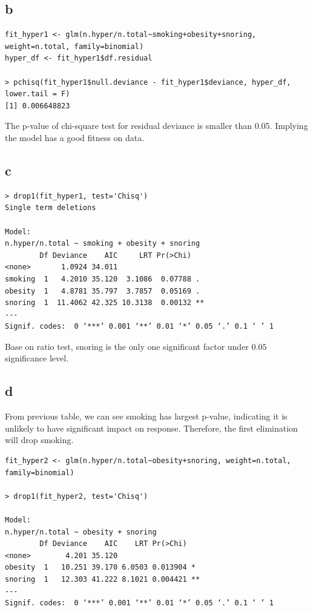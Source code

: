 \documentclass[11pt,letterpaper]{article}
\begin{document}
\subsection*{b}
\begin{verbatim}
fit_hyper1 <- glm(n.hyper/n.total~smoking+obesity+snoring, weight=n.total, family=binomial)
hyper_df <- fit_hyper1$df.residual

> pchisq(fit_hyper1$null.deviance - fit_hyper1$deviance, hyper_df, lower.tail = F)
[1] 0.006648823
\end{verbatim}

\noindent The p-value of chi-square test for residual deviance is smaller than 0.05. Implying the model has a good fitness on data. 

\subsection*{c}
\begin{verbatim}
> drop1(fit_hyper1, test='Chisq')
Single term deletions

Model:
n.hyper/n.total ~ smoking + obesity + snoring
        Df Deviance    AIC     LRT Pr(>Chi)   
<none>       1.0924 34.011                    
smoking  1   4.2010 35.120  3.1086  0.07788 . 
obesity  1   4.8781 35.797  3.7857  0.05169 . 
snoring  1  11.4062 42.325 10.3138  0.00132 **
---
Signif. codes:  0 ‘***’ 0.001 ‘**’ 0.01 ‘*’ 0.05 ‘.’ 0.1 ‘ ’ 1
\end{verbatim}

\noindent Base on ratio test, snoring is the only one significant factor under $0.05$ significance level. 

\subsection*{d}
\noindent From previous table, we can see smoking has largest p-value, indicating it is unlikely to have significant impact on response. Therefore, the first elimination will drop smoking. 

\begin{verbatim}
fit_hyper2 <- glm(n.hyper/n.total~obesity+snoring, weight=n.total, family=binomial)

> drop1(fit_hyper2, test='Chisq')

Model:
n.hyper/n.total ~ obesity + snoring
        Df Deviance    AIC    LRT Pr(>Chi)   
<none>        4.201 35.120                   
obesity  1   10.251 39.170 6.0503 0.013904 * 
snoring  1   12.303 41.222 8.1021 0.004421 **
---
Signif. codes:  0 ‘***’ 0.001 ‘**’ 0.01 ‘*’ 0.05 ‘.’ 0.1 ‘ ’ 1
\end{verbatim}
\end{document}
